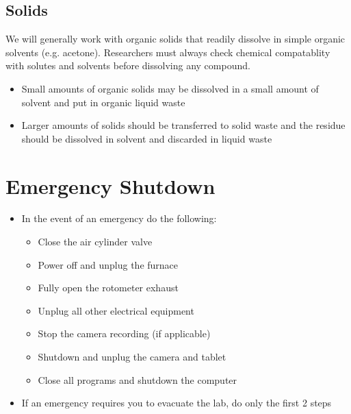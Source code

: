 \documentclass[letterpaper,11pt]{article}
\begin{document}
    \subsection{Solids} \label{sec:spill_solid}
    We will generally work with organic solids that readily dissolve in simple
    organic solvents (e.g. acetone). Researchers must always check chemical 
    compatablity with solutes and solvents before dissolving any compound.
    \begin{itemize}
    \item Small amounts of organic solids may be dissolved in a small amount of 
        solvent and put in organic liquid waste
    \item Larger amounts of solids should be transferred to solid waste and the
        residue should be dissolved in solvent and discarded in liquid waste
    \end{itemize}


\section{Emergency Shutdown} \label{sec:e_shtdn}

    \begin{itemize}
    \item In the event of an emergency do the following:
        
        \begin{itemize}
        \item Close the air cylinder valve
        \item Power off and unplug the furnace
        \item Fully open the rotometer exhaust
        \item Unplug all other electrical equipment
        \item Stop the camera recording (if applicable)
        \item Shutdown and unplug the camera and tablet
        \item Close all programs and shutdown the computer
        \end{itemize}
    
    \item If an emergency requires you to evacuate the lab, do only the first 
        2 steps
    \end{itemize}

\newpage    
\end{document}
